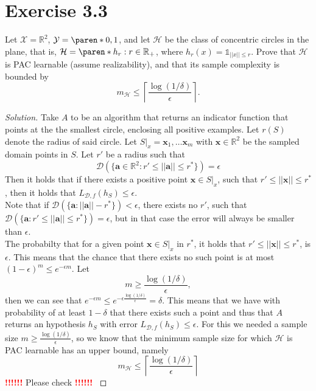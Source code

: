 \documentclass[10pt, a4paper, twoside]{amsart}
\newcommand{\R}{\ensuremath{\mathbb{R}}}
\DeclarePairedDelimiter\paren()
\newcommand{\Ind}{\ensuremath{\mathbb{1}}}
\newenvironment{solution}
               {\let\oldqedsymbol=\qedsymbol
                \renewcommand{\qedsymbol}{$\blacktriangleleft$}
                \begin{proof}[Solution]}
               {\end{proof}
                \renewcommand{\qedsymbol}{\oldqedsymbol}}
\newcommand{\TODO}{\textcolor{red}{\textbf{!!!!!! }}}
\begin{document}
\section*{Exercise 3.3}
Let $\mathcal{X} = \R^2$, $\mathcal{Y} = \paren*{0,1}$, and let $\mathcal{H}$ be the class of concentric circles in the plane, that is, $\mathcal{H}=\paren*{h_r:r \in \R_+}$, where $h_r(x) = \Ind_{||x|| \leq r}$. Prove that $\mathcal{H}$ is PAC learnable (assume realizability), and that its sample complexity is bounded by
\begin{equation*}
  m_{\mathcal{H}}\leq \left\lceil \frac{\log(1/\delta )}{\epsilon} \right\rceil .
\end{equation*}
\begin{solution}
  Take $A$ to be an algorithm that returns an indicator function that points at the the smallest circle, enclosing all positive examples. Let $r(S)$ denote the radius of said circle.
  Let $S|_x  = \mathbf{x}_1,\ldots \mathbf{x}_m$ with $\mathbf{x} \in \R^2$ be the sampled domain points in $S$. 
  Let $r'$ be a radius such that
  \begin{equation*}
    \mathcal{D}(\{\mathbf{a} \in \R^2 : r'\leq||\mathbf{a}|| \leq r^*\}) = \epsilon
  \end{equation*}
  Then it holds that if there exists a positive point $\mathbf{x} \in S|_x$, such that $r' \leq ||\mathbf{x}||\leq r^*$, then it holds that $L_{\mathcal{D},f}(h_S)\leq \epsilon$.\\
Note that if $\mathcal{D}(\{\mathbf{a}:||\mathbf{a}||-r^{*}\}) < \epsilon $, there exists no $r'$, such that $\mathcal{D}(\{\mathbf{a}:r'\leq||\mathbf{a}|| \leq r^*\}) = \epsilon$, but in that case the error will always be smaller than $\epsilon$.\\
  The probabilty that for a given point $\mathbf{x} \in S|_{x}$ in $r^*$, it holds that $r' \leq ||\mathbf{x}||\leq r^*$, is $\epsilon$. This means that the chance that there exists no such point is at most $(1-\epsilon)^m \leq e^{-\epsilon m}$. Let
\begin{equation*}
  m \geq \frac{\log(1/\delta)}{\epsilon},
\end{equation*}
then we can see that $e^{-\epsilon m} \leq e^{-\epsilon \frac{\log(1/\delta)}{\epsilon}} = \delta$. This means that we have with probability of at least $1- \delta$ that there exists such a point and thus that $A$ returns an hypothesis $h_S$ with error $L_{\mathcal{D},f}(h_S) \leq \epsilon$. For this we needed a sample size $m \geq \frac{\log(1/\delta)}{\epsilon}$, so we know that the minimum sample size for which $\mathcal{H}$ is PAC learnable has an upper bound, namely 
  \begin{equation*}
    m_{\mathcal{H}}\leq \left\lceil \frac{\log(1/\delta )}{\epsilon} \right\rceil
  \end{equation*}
  \TODO Please check \TODO
\end{solution}
\end{document}
